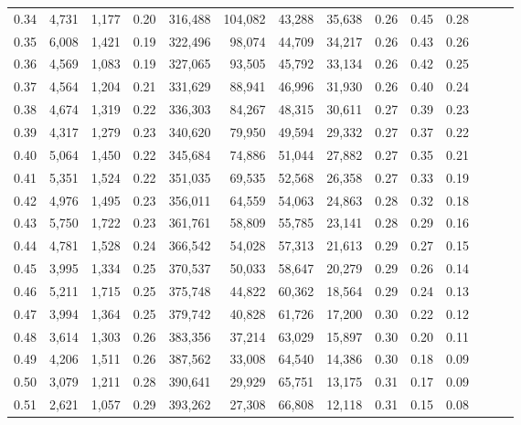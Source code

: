 \begin{tabular}{rrrrrrrrrrrrrr}
0.34 &   4,731 &  1,177 &  0.20 &  316,488 &  104,082 &  43,288 &  35,638 &  0.26 &  0.45 &      0.28 \\
0.35 &   6,008 &  1,421 &  0.19 &  322,496 &   98,074 &  44,709 &  34,217 &  0.26 &  0.43 &      0.26 \\
0.36 &   4,569 &  1,083 &  0.19 &  327,065 &   93,505 &  45,792 &  33,134 &  0.26 &  0.42 &      0.25 \\
0.37 &   4,564 &  1,204 &  0.21 &  331,629 &   88,941 &  46,996 &  31,930 &  0.26 &  0.40 &      0.24 \\
0.38 &   4,674 &  1,319 &  0.22 &  336,303 &   84,267 &  48,315 &  30,611 &  0.27 &  0.39 &      0.23 \\
0.39 &   4,317 &  1,279 &  0.23 &  340,620 &   79,950 &  49,594 &  29,332 &  0.27 &  0.37 &      0.22 \\
0.40 &   5,064 &  1,450 &  0.22 &  345,684 &   74,886 &  51,044 &  27,882 &  0.27 &  0.35 &      0.21 \\
0.41 &   5,351 &  1,524 &  0.22 &  351,035 &   69,535 &  52,568 &  26,358 &  0.27 &  0.33 &      0.19 \\
0.42 &   4,976 &  1,495 &  0.23 &  356,011 &   64,559 &  54,063 &  24,863 &  0.28 &  0.32 &      0.18 \\
0.43 &   5,750 &  1,722 &  0.23 &  361,761 &   58,809 &  55,785 &  23,141 &  0.28 &  0.29 &      0.16 \\
0.44 &   4,781 &  1,528 &  0.24 &  366,542 &   54,028 &  57,313 &  21,613 &  0.29 &  0.27 &      0.15 \\
0.45 &   3,995 &  1,334 &  0.25 &  370,537 &   50,033 &  58,647 &  20,279 &  0.29 &  0.26 &      0.14 \\
0.46 &   5,211 &  1,715 &  0.25 &  375,748 &   44,822 &  60,362 &  18,564 &  0.29 &  0.24 &      0.13 \\
0.47 &   3,994 &  1,364 &  0.25 &  379,742 &   40,828 &  61,726 &  17,200 &  0.30 &  0.22 &      0.12 \\
0.48 &   3,614 &  1,303 &  0.26 &  383,356 &   37,214 &  63,029 &  15,897 &  0.30 &  0.20 &      0.11 \\
0.49 &   4,206 &  1,511 &  0.26 &  387,562 &   33,008 &  64,540 &  14,386 &  0.30 &  0.18 &      0.09 \\
0.50 &   3,079 &  1,211 &  0.28 &  390,641 &   29,929 &  65,751 &  13,175 &  0.31 &  0.17 &      0.09 \\
0.51 &   2,621 &  1,057 &  0.29 &  393,262 &   27,308 &  66,808 &  12,118 &  0.31 &  0.15 &      0.08 \\

\end{tabular}
